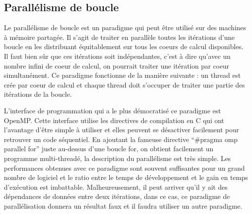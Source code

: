 \subsection{Parallélisme de boucle}
Le parallélisme de boucle est un paradigme qui peut être utilisé sur des machines à mémoire partagée.
%
Il s'agit de traiter en parallèle toutes les itérations d'une boucle en les distribuant équitablement sur tous les coeurs de calcul disponibles.
%
Il faut bien sûr que ces itérations soit indépendantes, c'est à dire qu'avec un nombre infini de coeur de calcul, on pourrait traiter une itération par coeur simultanément.
%
Ce paradigme fonctionne de la manière suivante : un thread est crée par coeur de calcul et chaque thread doit s'occuper de traiter une partie des itérations de la boucle.
%


L'interface de programmation qui a le plus démocratisé ce paradigme est OpenMP.
%
Cette interface utilise les directives de compilation en C qui ont l'avantage d'être simple à utiliser et elles peuvent se désactiver facilement pour retrouver un code séquentiel.
%
En ajoutant la fameuse directive ``\#pragma omp parallel for'' juste au-dessus d'une boucle for, on obtient facilement un programme multi-threadé, la description du parallélisme est très simple.
%
Les performances obtenues avec ce paradigme sont souvent suffisantes pour un grand nombre de logiciel et le ratio entre le temps de développement et le gain en temps d'exécution est imbattable.
%
Malheureusement, il peut arriver qu'il y ait des dépendances de données entre deux itérations, dans ce cas, ce paradigme de parallélisation donnera un résultat faux et il faudra utiliser un autre paradigme.
